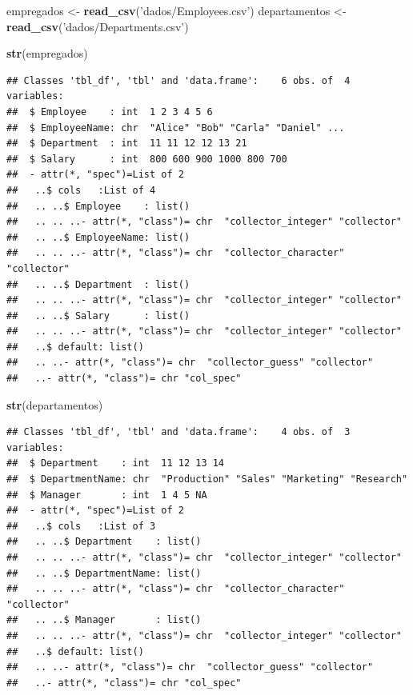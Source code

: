 \documentclass[]{book}
\newenvironment{Shaded}{\begin{snugshade}}{\end{snugshade}}
\newcommand{\KeywordTok}[1]{\textcolor[rgb]{0.13,0.29,0.53}{\textbf{#1}}}
\newcommand{\StringTok}[1]{\textcolor[rgb]{0.31,0.60,0.02}{#1}}
\newcommand{\NormalTok}[1]{#1}
\begin{document}
\begin{Shaded}
\begin{Highlighting}[]
\NormalTok{empregados <-}\StringTok{ }\KeywordTok{read_csv}\NormalTok{(}\StringTok{'dados/Employees.csv'}\NormalTok{)}
\NormalTok{departamentos <-}\StringTok{ }\KeywordTok{read_csv}\NormalTok{(}\StringTok{'dados/Departments.csv'}\NormalTok{)}

\KeywordTok{str}\NormalTok{(empregados)}
\end{Highlighting}
\end{Shaded}

\begin{verbatim}
## Classes 'tbl_df', 'tbl' and 'data.frame':    6 obs. of  4 variables:
##  $ Employee    : int  1 2 3 4 5 6
##  $ EmployeeName: chr  "Alice" "Bob" "Carla" "Daniel" ...
##  $ Department  : int  11 11 12 12 13 21
##  $ Salary      : int  800 600 900 1000 800 700
##  - attr(*, "spec")=List of 2
##   ..$ cols   :List of 4
##   .. ..$ Employee    : list()
##   .. .. ..- attr(*, "class")= chr  "collector_integer" "collector"
##   .. ..$ EmployeeName: list()
##   .. .. ..- attr(*, "class")= chr  "collector_character" "collector"
##   .. ..$ Department  : list()
##   .. .. ..- attr(*, "class")= chr  "collector_integer" "collector"
##   .. ..$ Salary      : list()
##   .. .. ..- attr(*, "class")= chr  "collector_integer" "collector"
##   ..$ default: list()
##   .. ..- attr(*, "class")= chr  "collector_guess" "collector"
##   ..- attr(*, "class")= chr "col_spec"
\end{verbatim}

\begin{Shaded}
\begin{Highlighting}[]
\KeywordTok{str}\NormalTok{(departamentos)}
\end{Highlighting}
\end{Shaded}

\begin{verbatim}
## Classes 'tbl_df', 'tbl' and 'data.frame':    4 obs. of  3 variables:
##  $ Department    : int  11 12 13 14
##  $ DepartmentName: chr  "Production" "Sales" "Marketing" "Research"
##  $ Manager       : int  1 4 5 NA
##  - attr(*, "spec")=List of 2
##   ..$ cols   :List of 3
##   .. ..$ Department    : list()
##   .. .. ..- attr(*, "class")= chr  "collector_integer" "collector"
##   .. ..$ DepartmentName: list()
##   .. .. ..- attr(*, "class")= chr  "collector_character" "collector"
##   .. ..$ Manager       : list()
##   .. .. ..- attr(*, "class")= chr  "collector_integer" "collector"
##   ..$ default: list()
##   .. ..- attr(*, "class")= chr  "collector_guess" "collector"
##   ..- attr(*, "class")= chr "col_spec"
\end{verbatim}
\end{document}
